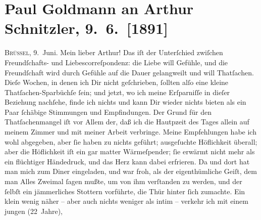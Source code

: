 

               \section[Paul Goldmann an Arthur Schnitzler, 9. 6. {[}1891{]}]{ Paul Goldmann an Arthur Schnitzler, 9. 6. {[}1891{]}}\nopagebreak{}\rehead{ }\begin{ledgroupsized}[t]{13cm}\normalsize\beginnumbering{} \toendnotes[C]{\smallbreak\pagebreak[2]} 
\toendnotes[C]{\smallbreak}\pstart
           \raggedleft{}{\pb}\textsc{Brüssel}, 9. Juni.\pend
           \pstart\center{}Mein lieber Arthur!\pend\pstart
           Das iſt der Unterſchied zwiſchen Freundſchafts- und Liebescorreſpondenz: die Liebe
               will Gefühle, und die Freundſchaft wird durch Gefühle auf die Dauer gelangweilt und
               will Thatſachen. Dieſe Wochen, in denen ich Dir nicht geſchrieben, ſollten alſo eine
               kleine Thatſachen-Sparbüchſe ſein; und jetzt, wo ich meine Erſparniſſe in dieſer
               Beziehung nachſehe, finde ich nichts und kann Dir wieder nichts bieten als ein Paar
               ſchäbige Stimmungen und Empfindungen. Der Grund für den Thatſachenmangel iſt vor
               Allem der, daß ich die Hautpzeit des Tages allein auf meinem Zimmer und mit meiner
               Arbeit verbringe. Meine Empfehlungen habe ich wohl abgegeben, aber ſie haben zu
               nichts geführt; ausgeſuchte Höflichkeit überall; aber die Höflichkeit iſt ein gar
               matter Wärmeſpender; ſie erwärmt nicht mehr als ein flüchtiger Händedruck, und das
               Herz kann dabei erfrieren. Da und dort hat man mich zum Diner eingeladen, und war
               froh, als der eigenthümliche Geiſt, dem man Alles Zweimal ſagen mußte, um von ihm
               verſtanden zu werden, und der ſelbſt ein jämmerliches Stottern vorführte, die {\pb}Thür hinter ſich zumachte. Ein klein wenig näher –
               aber auch nichts weniger als intim – verkehr ich mit einem jungen \label{K_L02664-5v}\label{K_L02664-5h} (22 Jahre),

\end{ledgroupsized}
